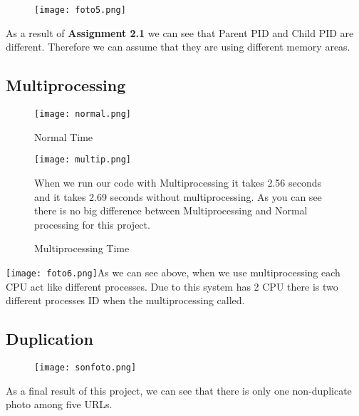\documentclass[onecolumn]{article}
\begin{document}
\begin{figure}[h]
\texttt{[image: foto5.png]}
\centering
\end{figure}
As a result of \textbf{Assignment 2.1} we can see that Parent PID and Child PID are different. Therefore we can assume that they are using different memory areas.\newline

\subsection{Multiprocessing}
\begin{figure}[h]
    \centering
    \begin{minipage}{0.5\textwidth}
        \centering
        \texttt{[image: normal.png]} %
        \caption{Normal Time}
    \end{minipage}\hfill
    \begin{minipage}{0.5\textwidth}
        \centering
        \texttt{[image: multip.png]} %
        \caption{Multiprocessing Time}
    \end{minipage}
    \bigbreak
    When we run our code with Multiprocessing it takes 2.56 seconds and it takes 2.69 seconds without multiprocessing. As you can see there is no big difference between Multiprocessing and Normal processing for this project.
\end{figure}

 \texttt{[image: foto6.png]}\newline\newline As we can see above, when we use multiprocessing each CPU act like different processes. Due to this system has 2 CPU there is two different processes ID when the multiprocessing called.


\subsection{Duplication}

\begin{figure}[h]
\texttt{[image: sonfoto.png]}
\centering
\end{figure}

As a final result of this project, we can see that there is only one non-duplicate photo among five URLs.
\end{document}
